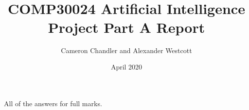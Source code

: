 \documentclass[a4paper,11pt]{article}
\author{Cameron Chandler and Alexander Westcott}
\title{COMP30024 Artificial Intelligence Project Part A Report}
\date{April 2020}
\begin{document}
\maketitle

All of the answers for full marks.

\end{document}
